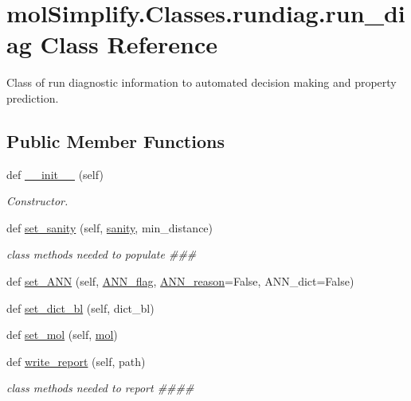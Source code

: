 \hypertarget{classmolSimplify_1_1Classes_1_1rundiag_1_1run__diag}{}\section{mol\+Simplify.\+Classes.\+rundiag.\+run\+\_\+diag Class Reference}
\label{classmolSimplify_1_1Classes_1_1rundiag_1_1run__diag}


Class of run diagnostic information to automated decision making and property prediction.  


\subsection*{Public Member Functions}
\begin{DoxyCompactItemize}
\item 
def \hyperlink{classmolSimplify_1_1Classes_1_1rundiag_1_1run__diag_a991e53c0bab164d1b921960f19597890}{\+\_\+\+\_\+init\+\_\+\+\_\+} (self)
\begin{DoxyCompactList}\small\item\em Constructor. \end{DoxyCompactList}\item 
def \hyperlink{classmolSimplify_1_1Classes_1_1rundiag_1_1run__diag_a659afacfb2e4f24e08ee965d9b93a7e2}{set\+\_\+sanity} (self, \hyperlink{classmolSimplify_1_1Classes_1_1rundiag_1_1run__diag_a0ef07fdeafae0c40968a4b2cffc5ca33}{sanity}, min\+\_\+distance)
\begin{DoxyCompactList}\small\item\em class methods needed to populate \#\#\# \end{DoxyCompactList}\item 
def \hyperlink{classmolSimplify_1_1Classes_1_1rundiag_1_1run__diag_a065d2729214e5d3af49f9435a585cb11}{set\+\_\+\+A\+NN} (self, \hyperlink{classmolSimplify_1_1Classes_1_1rundiag_1_1run__diag_ab77602b8de86bb282c07b2243f134590}{A\+N\+N\+\_\+flag}, \hyperlink{classmolSimplify_1_1Classes_1_1rundiag_1_1run__diag_a92f327be2e53727b00848e18f8427af9}{A\+N\+N\+\_\+reason}=False, A\+N\+N\+\_\+dict=False)
\item 
def \hyperlink{classmolSimplify_1_1Classes_1_1rundiag_1_1run__diag_aafd5fdd0e5de8e0d1caf2de4ee328599}{set\+\_\+dict\+\_\+bl} (self, dict\+\_\+bl)
\item 
def \hyperlink{classmolSimplify_1_1Classes_1_1rundiag_1_1run__diag_a3ad834b2a3202758c1801986cc9c77e2}{set\+\_\+mol} (self, \hyperlink{classmolSimplify_1_1Classes_1_1rundiag_1_1run__diag_a403fc5dcab3e50c5fec055bf9bbf6fb0}{mol})
\item 
def \hyperlink{classmolSimplify_1_1Classes_1_1rundiag_1_1run__diag_a68d29a7ca70f2138da2740feaee1c7cd}{write\+\_\+report} (self, path)
\begin{DoxyCompactList}\small\item\em class methods needed to report \#\#\#\# \end{DoxyCompactList}\end{DoxyCompactItemize}
